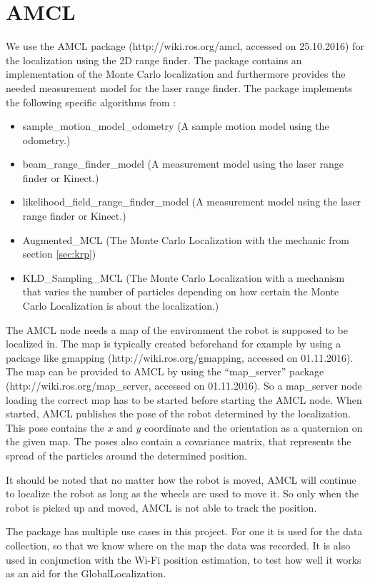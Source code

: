 \section{AMCL}\label{sec:amcl}
We use the AMCL package (http://wiki.ros.org/amcl, accessed on 25.10.2016) for the localization using the 2D range finder. The package contains an implementation of the Monte Carlo localization and furthermore provides the needed measurement model for the laser range finder. The package implements the following specific algorithms from \citet{Thrun:2005:PR:1121596}:
\begin{itemize}
\item sample\_motion\_model\_odometry (A sample motion model using the odometry.)
\item beam\_range\_finder\_model (A measurement model using the laser range finder or Kinect.)
\item likelihood\_field\_range\_finder\_model (A measurement model using the laser range finder or Kinect.)
\item Augmented\_MCL (The Monte Carlo Localization with the mechanic from section \ref{sec:krp})
\item KLD\_Sampling\_MCL (The Monte Carlo Localization with a mechanism that varies the number of particles depending on how certain the Monte Carlo Localization is about the localization.)
\end{itemize}
The AMCL node needs a map of the environment the robot is supposed to be localized in. The map is typically created beforehand for example by using a package like gmapping (http://wiki.ros.org/gmapping, accessed on 01.11.2016). The map can be provided to AMCL by using the ``map\_server'' package (http://wiki.ros.org/map\_server, accessed on 01.11.2016). So a map\_server node loading the correct map has to be started before starting the AMCL node.
When started, AMCL publishes the pose of the robot determined by the localization. This pose contains the $x$ and $y$ coordinate and the orientation as a quaternion on the given map. The poses also contain a covariance matrix, that represents the spread of the particles around the determined position. 

It should be noted that no matter how the robot is moved, AMCL will continue to localize the robot as long as the wheels are used to move it. So only when the robot is picked up and moved, AMCL is not able to track the position.

The package has multiple use cases in this project. For one it is used for the data collection, so that we know where on the map the data was recorded. It is also used in conjunction with the Wi-Fi position estimation, to test how well it works as an aid for the \gls{GlobalLocalization}. 

